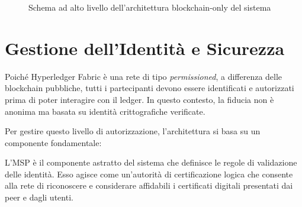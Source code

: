 \begin{figure}[H]
    \centering
    \caption{Schema ad alto livello dell'architettura blockchain-only del sistema}
    \label{fig:architettura}
\end{figure}

\section{Gestione dell'Identità e Sicurezza}

Poiché Hyperledger Fabric è una rete di tipo \textit{permissioned}, a differenza delle blockchain pubbliche, tutti i partecipanti devono essere identificati e autorizzati prima di poter interagire con il ledger. In questo contesto, la fiducia non è anonima ma basata su identità crittografiche verificate.

Per gestire questo livello di autorizzazione, l'architettura si basa su un componente fondamentale:

\begin{definizione}
L'MSP è il componente astratto del sistema che definisce le regole di validazione delle identità. Esso agisce come un'autorità di certificazione logica che consente alla rete di riconoscere e considerare affidabili i certificati digitali presentati dai peer e dagli utenti.
\end{definizione}

